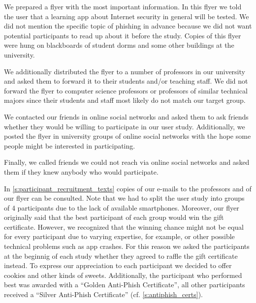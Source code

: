 \begin{description}[leftmargin=0cm]
\item[Flyer:]  We prepared a flyer with the most important information. 
In this flyer we told the user that a learning app about Internet security in general will be tested. 
We did not mention the specific topic of phishing in advance because we did not want potential participants to read up about it before the study.
Copies of this flyer were hung on blackboards of student dorms and some other buildings at the university.
\item[E-Mail to Professors:] We additionally distributed the flyer to a number of professors in our university and asked them to forward it to their students and/or teaching staff.
We did not forward the flyer to computer science professors or professors of similar technical majors since their students and staff most likely do not match our target group.
\item[Online Social Networks:] We contacted our friends in online social networks and asked them to ask friends whether they would be willing to participate in our user study.
Additionally, we posted the flyer in university groups of online social networks with the hope some people might be interested in participating.
\item[Further Networks:] Finally, we called friends we could not reach via online social networks and asked them if they knew anybody who would participate.
\end{description}
In \autoref{s:participant_recruitment_texts} copies of our e-mails to the professors and of our flyer can be consulted.
Note that we had to split the user study into groups of 4 participants due to the lack of available smartphones.
Moreover, our flyer originally said that the best participant of each group would win the gift certificate.
However, we recognized that the winning chance might not be equal for every participant due to varying expertise, for example, or other possible technical problems such as app crashes.
For this reason we asked the participants at the beginnig of each study whether they agreed to raffle the gift certificate instead.
To express our appreciation to each participant we decided to offer cookies and other kinds of sweets.
Additionally, the participant who performed best was awarded with a ``Golden Anti-Phish Certificate'', all other participants received a ``Silver Anti-Phish Certificate'' (cf. \autoref{s:antiphish_certs}).

